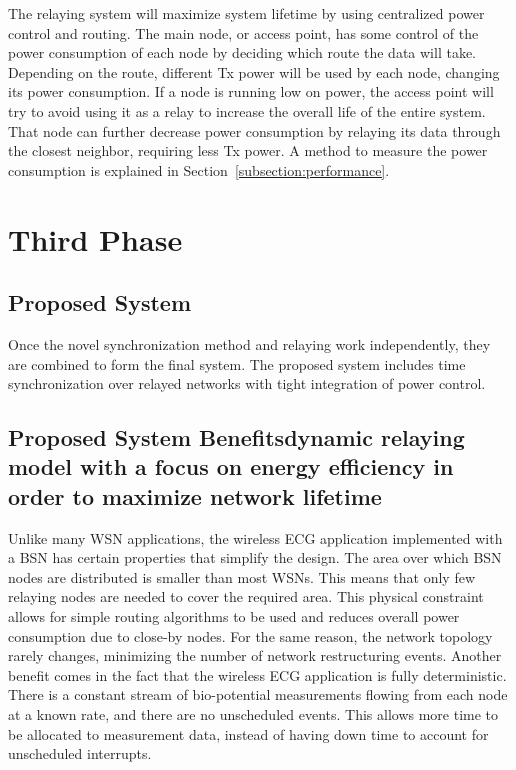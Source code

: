 \documentclass{article}
\begin{document}
The relaying system will maximize system lifetime by using centralized power control and routing. The main node, or access point, has some control of the power consumption of each node by deciding which route the data will take. Depending on the route, different Tx power will be used by each node, changing its power consumption. If a node is running low on power, the access point will try to avoid using it as a relay to increase the overall life of the entire system. That node can further decrease power consumption by relaying its data through the closest neighbor, requiring less Tx power. A method to measure the power consumption is explained in Section~\ref{subsection:performance}.

\section{Third Phase}\label{section:thirdphase}

\subsection{Proposed System}\label{subsection:proposed}
Once the novel synchronization method and relaying work independently, they are combined to form the final system. The proposed system includes time synchronization over relayed networks with tight integration of power control.

\subsection{Proposed System Benefitsdynamic relaying model with a focus on energy efficiency in order to maximize network lifetime}
Unlike many WSN applications, the wireless ECG application implemented with a BSN has certain properties that simplify the design. The area over which BSN nodes are distributed is smaller than most WSNs. This means that only few relaying nodes are needed to cover the required area. This physical constraint allows for simple routing algorithms to be used and reduces overall power consumption due to close-by nodes. For the same reason, the network topology rarely changes, minimizing the number of network restructuring events. Another benefit comes in the fact that the wireless ECG application is fully deterministic. There is a constant stream of bio-potential measurements flowing from each node at a known rate, and there are no unscheduled events. This allows more time to be allocated to measurement data, instead of having down time to account for unscheduled interrupts.
\end{document}

